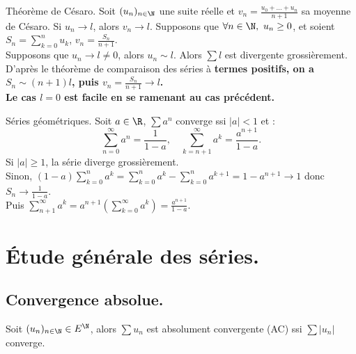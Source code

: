 \documentclass[11pt]{article}
\begin{document}
\vspace*{0.4cm}

\begin{ex}{Théorème de Césaro.}{}
    Soit $(u_n)_{n\in\N}$ une suite réelle et $v_n=\frac{u_0+...+u_n}{n+1}$ sa moyenne de Césaro. Si $u_n\to l$, alors $v_n \to l$.
    \tcblower
    Supposons que $\forall n \in \N, ~ u_n \geq 0$, et soient $S_n = \sum_{k=0}^n u_k$, $v_n=\frac{S_n}{n+1}$.\\
    Supposons que $u_n \to l \neq 0$, alors $u_n \sim l$. Alors $\sum l$ est divergente grossièrement.\\
    D'après le théorème de comparaison des séries à \bf{termes positifs}, on a $S_n \sim (n+1)l$, puis $v_n=\frac{S_n}{n+1}\to l$.\\
    Le cas $l=0$ est facile en se ramenant au cas précédent.
\end{ex}

\vspace*{-0.7cm}

\begin{rappel}{Séries géométriques.}{}
    Soit $a\in \R$, $\sum a^n$ converge ssi $|a|<1$ et :
    \begin{equation*}
        \sum_{n=0}^\infty a^n = \frac{1}{1-a}, \quad \sum_{k=n+1}^\infty a^k = \frac{a^{n+1}}{1-a}.
    \end{equation*}
    \tcblower
    Si $|a|\geq1$, la série diverge grossièrement.\\
    Sinon, $(1-a)\sum_{k=0}^na^k=\sum_{k=0}^na^k-\sum_{k=0}^na^{k+1}=1-a^{n+1}\to1$ donc $S_n\to\frac{1}{1-a}$.\\
    Puis $\sum_{n+1}^\infty a^k = a^{n+1}\left( \sum_{k=0}^\infty a^k \right)=\frac{a^{n+1}}{1-a}$.
\end{rappel}

\section{Étude générale des séries.}

\subsection{Convergence absolue.}

\begin{defi}{}{}
    Soit $(u_n)_{n\in\N}\in E^\N$, alors $\sum u_n$ est absolument convergente (AC) ssi $\sum|u_n|$ converge.
\end{defi}

\vspace*{-0.7cm}
\end{document}
